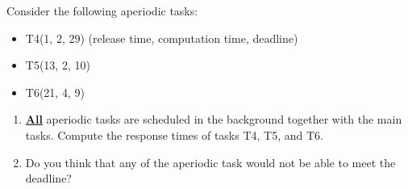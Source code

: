 Consider the following aperiodic tasks:
\begin{itemize}
    \item T4(1, 2, 29) (release time, computation time, deadline)
    \item T5(13, 2, 10)
    \item T6(21, 4, 9)
\end{itemize}

\begin{enumerate}
\addtocounter{enumi}{3}
\item \textbf{\underline{All}} aperiodic tasks are scheduled in the background together with the main tasks. Compute the response times of tasks T4, T5, and T6. 
\item Do you think that any of the aperiodic task would not be able to meet the deadline?
\end{enumerate}
